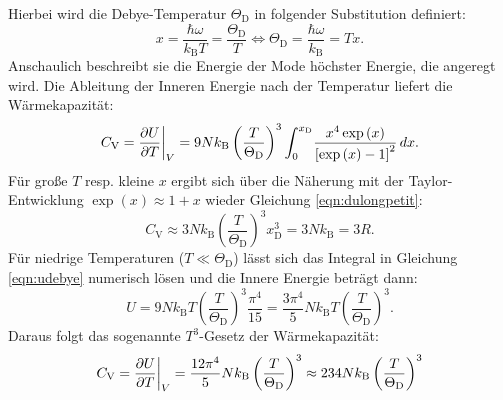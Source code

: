 Hierbei wird die Debye-Temperatur $\Theta_{\text{D}}$ in folgender Substitution definiert:
\begin{equation*}
	x = \frac{\hbar \omega}{k_{\text{B}} T} = \frac{\Theta_{\text{D}}}{T} \Leftrightarrow  \Theta_{\text{D}} = \frac{\hbar \omega}{k_{\text{B}}} = T x.
\end{equation*}
Anschaulich beschreibt sie die Energie der Mode höchster Energie, die angeregt wird.
Die Ableitung der Inneren Energie nach der Temperatur liefert die Wärmekapazität:
\begin{equation*}
	C_{\text{V}} = \frac{\partial U}{\partial T} \bigg{\vert}_{V} = 9 N k_{\text{B}} \left( \frac{T}{\Theta_{\text{D}}} \right)^3 \int_{0}^{x_{\text{D}}} \! \frac{ x^4 \exp{(x)}}{ \left[ \exp{ (x) } - 1  \right]^2}  \, dx.
\end{equation*}
Für große $T$ resp. kleine $x$ ergibt sich über die Näherung mit der Taylor-Entwicklung $\exp(x) \approx 1 + x $ wieder Gleichung \eqref{eqn:dulongpetit}:
\begin{equation*}
	C_{\text{V}} \approx 3 N k_{\text{B}} \left( \frac{T}{\Theta_{\text{D}}} \right)^3 x_{\text{D}}^3= 3 N k_{\text{B}} = 3 R.
\end{equation*}
Für niedrige Temperaturen ($T \ll \Theta_{\text{D}}$) lässt sich das Integral in Gleichung \eqref{eqn:udebye} numerisch lösen und die Innere Energie beträgt dann:
\begin{equation*}
	U = 9 N k_{\text{B}} T \left( \frac{T}{\Theta_{\text{D}}} \right)^3 \frac{\pi^4}{15} = \frac{3 \pi^4}{5} N k_{\text{B}} T \left( \frac{T}{\Theta_{\text{D}}} \right)^3.
\end{equation*}
Daraus folgt das sogenannte $T^3$-Gesetz der Wärmekapazität:
\begin{equation*}
	C_{\text{V}} = \frac{\partial U}{\partial T} \bigg{\vert}_{V} = \frac{12 \pi^4}{5} N k_{\text{B}} \left( \frac{T}{\Theta_{\text{D}}} \right)^3 \approx 234 N k_{\text{B}} \left( \frac{T}{\Theta_{\text{D}}} \right)^3
\end{equation*}
\FloatBarrier
